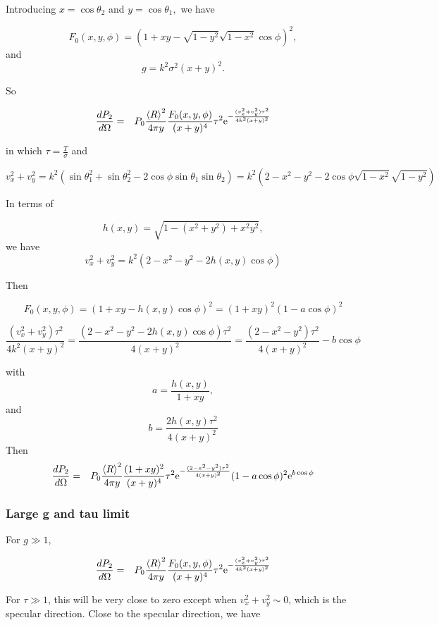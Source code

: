\documentclass[11pt,openany]{report}
\newcommand{\der}[2]{\frac{d {#1}}{d {#2}}}
\newcommand{\e}{{\rm e}}
\begin{document}
{{Introducing $x=\cos\theta_{2}$ and $y=\cos\theta_{1},$ we have

$$F_{0}(x,y,\phi)=\left(1+xy-\sqrt{1-y^{2}}\sqrt{1-x^{2}}\cos\phi\right)^{2},$$
and
$$g=k^{2}\sigma^{2}(x+y)^{2}.$$

So

\begin{eqnarray}
\der{P_{2}}{\Omega}&=&P_{0}\frac{\left<R\right>^{2}}{4\pi y}\frac{F_{0}(x,y,\phi)}{(x+y)^{4}}\tau^{2}\e^{-\frac{(v_{x}^{2}+v_{y}^{2})\tau^{2}}{4k^{2}(x+y)^{2}}}\end{eqnarray}

in which $\tau=\frac{T}{\sigma}$
and

$$v_{x}^{2}+v_{y}^{2}=k^{2}\left(\sin\theta_{1}^{2}+\sin\theta_{2}^{2}-2\cos\phi\sin\theta_{1}\sin\theta_{2}\right)=k^{2}\left(2-x^{2}-y^{2}-2\cos\phi\sqrt{1-x^{2}}\sqrt{1-y^{2}}\right)$$

In terms of 

$$h(x,y)=\sqrt{1-(x^{2}+y^{2})+x^{2}y^{2}},$$
we have
$$v_{x}^{2}+v_{y}^{2}=k^{2}\left(2-x^{2}-y^{2}-2h(x,y)\cos\phi\right)$$

Then

$$F_{0}(x,y,\phi)=\left(1+xy-h(x,y)\cos\phi\right)^{2}=(1+xy)^{2}(1-a\cos\phi)^{2}$$

$$\frac{(v_{x}^{2}+v_{y}^{2})\tau^{2}}{4k^{2}(x+y)^{2}}=\frac{\left(2-x^{2}-y^{2}-2h(x,y)\cos\phi\right)\tau^{2}}{4(x+y)^{2}}=\frac{\left(2-x^{2}-y^{2}\right)\tau^{2}}{4(x+y)^{2}}-b\cos\phi$$

with
$$a=\frac{h(x,y)}{1+xy},$$
and
$$b=\frac{2h(x,y)\tau^{2}}{4(x+y)^{2}}$$
Then
\begin{eqnarray}\der{P_{2}}{\Omega}
&=&P_{0}\frac{\left<R\right>^{2}}{4\pi y}\frac{(1+xy)^{2}}{(x+y)^{4}}\tau^{2}\e^{-\frac{(2-x^{2}-y^{2})\tau^{2}}{4(x+y)^{2}}}(1-a\cos\phi)^{2}\e^{b\cos\phi}\end{eqnarray}

\subsubsection{Large g and tau limit}
For $g\gg 1$,

\begin{eqnarray}
\der{P_{2}}{\Omega}&=&P_{0}\frac{\left<R\right>^{2}}{4\pi y}\frac{F_{0}(x,y,\phi)}{(x+y)^{4}}\tau^{2}\e^{-\frac{(v_{x}^{2}+v_{y}^{2})\tau^{2}}{4k^{2}(x+y)^{2}}}\end{eqnarray}

For $\tau\gg 1$, this will be very close to zero except when $v_{x}^{2}+v_{y}^{2}\sim0$, which is the specular direction. Close to the specular direction, we have

}}
\end{document}
